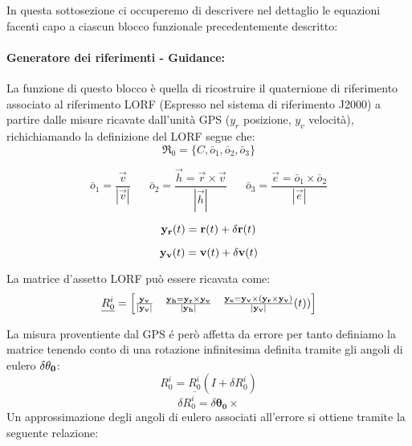 In questa sottosezione ci occuperemo di descrivere nel dettaglio le equazioni
facenti capo a ciascun blocco funzionale precedentemente descritto:
\paragraph{ Generatore dei riferimenti - Guidance:}
La funzione di questo blocco è quella di ricostruire il quaternione di
riferimento associato al riferimento LORF (Espresso nel sistema di riferimento
J2000) a partire dalle misure ricavate dall'unità GPS ($y_r$ posizione, $y_v$
velocità), richichiamando la definizione del LORF segue che:
\begin{equation}
	\mathfrak{R_0} = \{C,\bar{o}_1,\bar{o}_2,\bar{o}_3\}
\end{equation}

\begin{equation}
\bar{o}_1 = \frac{\vec{v}}{|\vec{v}|} \hspace{20pt}%
\bar{o}_2 = \frac{\vec{h}=\vec{r} \times \vec{v}}{|\vec{h}|} \hspace{20pt}%
\bar{o}_3 = \frac{\vec{e}=\bar{o}_1 \times \bar{o}_2}{|\vec{e}|}
\end{equation}

\begin{equation}
	\mathbf{y_r}(t) = \mathbf{r}(t) + \delta \mathbf{r}(t)
\end{equation}

\begin{equation}
	\mathbf{y_v}(t) = \mathbf{v}(t) + \delta \mathbf{v}(t)
\end{equation}

La matrice d'assetto LORF può essere ricavata come:
\begin{equation}
\underline{R_{0}^{i}}=
\begin{bmatrix}
	\frac{\mathbf{y_v}}{|\mathbf{y_v}|} &
	\frac{\mathbf{y_h}=\mathbf{y_r}	\times \mathbf{y_v}}{|\mathbf{y_h}|} &
	\frac{\mathbf{y_e}=\mathbf{y_v} \times (\mathbf{y_r}\times\mathbf{y_v})}{|\mathbf{y_v}|}(t))
\end{bmatrix}
\end{equation}

La misura proventiente dal GPS é però affetta da errore per tanto definiamo la
matrice tenendo conto di una rotazione infinitesima definita
tramite gli angoli di eulero $\delta\mathbf{\theta_0}$:
\begin{equation}
R_{0}^{i}=\underline{R_{0}^{i}}(I+\delta R_{0}^{i})
\end{equation}
\begin{equation}
\delta R_{0}^{i} = \delta\boldsymbol{\theta_0} \times
\end{equation}
Un approssimazione degli angoli di eulero associati all'errore si ottiene
tramite la seguente relazione:

